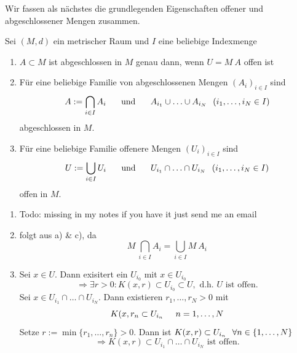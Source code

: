 Wir fassen als nächstes die grundlegenden Eigenschaften offener und abgeschlossener Mengen zusammen.

\begin{prop}
	Sei $(M, d)$ ein metrischer Raum und $I$ eine beliebige Indexmenge
	\begin{enumerate}[label=\alph*\upshape)]
		\item $A \subset M$ ist abgeschlossen in $M$ genau dann, wenn $U = M \ A$ offen ist
		\item Für eine beliebige Familie von abgeschlossenen Mengen $(A_{i})_{i \in I}$ sind 
			\[ A := \bigcap_{i \in I} A_{i} \hspace{0.5cm} \text{ und } \hspace{0.5cm} A_{i_{1}} \cup \dotsc \cup A_{i_{N}} \hspace{0.25cm} (i_{1}, \dotsc, i_{N} \in I) \]
			abgeschlossen in $M$.
		\item Für eine beliebige Familie offenere Mengen $(U_{i})_{i \in I}$ sind
			\[ U := \bigcup_{i \in I} U_{i} \hspace{0.5cm} \text{ und } \hspace{0.5cm} U_{i_{1}} \cap \dotsc \cap U_{i_{N}} \hspace{0.25cm} (i_{1}, \dotsc, i_{N} \in I) \] 
			offen in $M$.
	\end{enumerate}
	\begin{beweis}
		\begin{enumerate}[label=\alph*\upshape)]
			\item Todo: missing in my notes if you have it just send me an email %
			\item folgt aus a) \& c), da
				\[ M \ \bigcap_{i \in I} A_{i} = \bigcup_{i \in I} M \ A_{i} \]
			\item Sei $x \in U$. Dann exisitert ein $U_{i_{0}}$ mit $x \in U_{i_{0}}$
			\[ \Rightarrow \exists r > 0: K(x, r) \subset U_{i_{0}} \subset U, \text{ d.h. } U \text{ ist offen.}  \]
			Sei $x \in U_{i_{1}} \cap \dotsc \cap U_{i_{N}}.$ Dann existieren $r_{1}, \dotsc, r_{N} > 0$ mit
			\[ K(x, r_{n} \subset U_{i_{n}} \hspace{0.5cm} n = 1, \dotsc, N \]
			Setze $r := \min \{ r_{1}, \dotsc, r_{n} \} > 0$. Dann ist $K(x, r) \subset U_{i_{n}} \hspace{0.25cm} \forall n \in \{ 1, \dotsc, N \}$
			\[ \Rightarrow K(x, r) \subset U_{i_{1}} \cap \dotsc \cap U_{i_{N}} \text{ ist offen.} \]
		\end{enumerate}	
	\end{beweis}
\end{prop}

